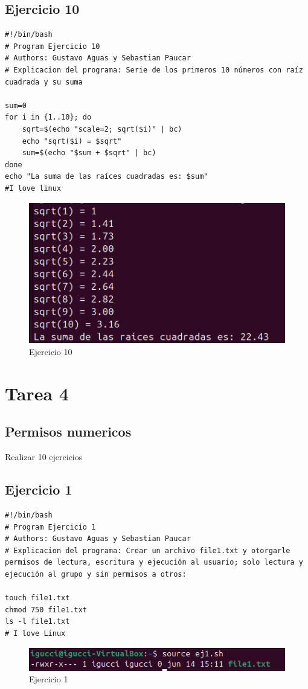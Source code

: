 \documentclass[11pt,twoside]{book}
\begin{document}
\subsection{Ejercicio 10}

\begin{lstlisting}
#!/bin/bash
# Program Ejercicio 10
# Authors: Gustavo Aguas y Sebastian Paucar
# Explicacion del programa: Serie de los primeros 10 números con raíz cuadrada y su suma

sum=0
for i in {1..10}; do
    sqrt=$(echo "scale=2; sqrt($i)" | bc)
    echo "sqrt($i) = $sqrt"
    sum=$(echo "$sum + $sqrt" | bc)
done
echo "La suma de las raíces cuadradas es: $sum"
#I love linux
\end{lstlisting}
\begin{figure}[h]
    \centering
    \includegraphics[width=0.75\linewidth]{series/ej10.png}
    \caption{Ejercicio 10}
\end{figure}

\newpage
\section{Tarea 4}
\subsection{Permisos numericos}
Realizar 10 ejercicios
\subsection{Ejercicio 1}
\begin{lstlisting}
#!/bin/bash
# Program Ejercicio 1
# Authors: Gustavo Aguas y Sebastian Paucar
# Explicacion del programa: Crear un archivo file1.txt y otorgarle permisos de lectura, escritura y ejecución al usuario; solo lectura y ejecución al grupo y sin permisos a otros:

touch file1.txt
chmod 750 file1.txt
ls -l file1.txt
# I love Linux
\end{lstlisting}
\begin{figure}[h]
    \centering
    \includegraphics[width=1\linewidth]{pnum/ej1.png}
    \caption{Ejercicio 1}
\end{figure}
\end{document}

